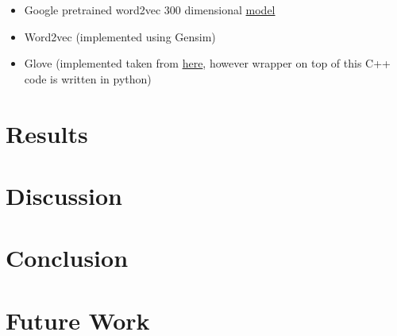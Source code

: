 \documentclass[english]{sobraep}
\begin{document}
\begin{itemize}
    \item Google pretrained word2vec 300 dimensional \href{
https://www.kaggle.com/datasets/leadbest/googlenewsvectorsnegative300}{model}
    \item Word2vec (implemented using Gensim)
    \item Glove (implemented taken from \href{https://github.com/stanfordnlp/GloVe}{here}, however wrapper on top of this C++ code is written in python)
\end{itemize}
\section{Results}

\section{Discussion}

\section{Conclusion}

\section{Future Work}


\begin{acks}
\end{acks}






\end{document}
